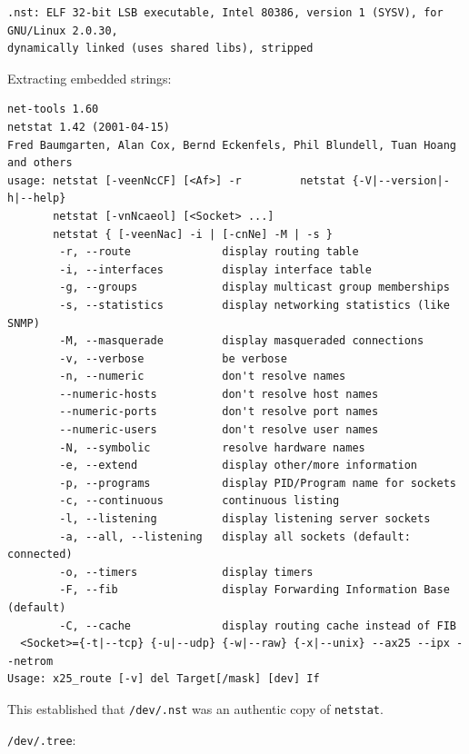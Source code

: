 \begin{lstlisting}[style=terminal]
.nst: ELF 32-bit LSB executable, Intel 80386, version 1 (SYSV), for GNU/Linux 2.0.30, 
dynamically linked (uses shared libs), stripped
\end{lstlisting}

\vspace{1em}

Extracting embedded strings:

\vspace{1em}

\begin{lstlisting}[style=terminal]
net-tools 1.60
netstat 1.42 (2001-04-15)
Fred Baumgarten, Alan Cox, Bernd Eckenfels, Phil Blundell, Tuan Hoang and others
usage: netstat [-veenNcCF] [<Af>] -r         netstat {-V|--version|-h|--help}
       netstat [-vnNcaeol] [<Socket> ...]
       netstat { [-veenNac] -i | [-cnNe] -M | -s }
        -r, --route              display routing table
        -i, --interfaces         display interface table
        -g, --groups             display multicast group memberships
        -s, --statistics         display networking statistics (like SNMP)
        -M, --masquerade         display masqueraded connections
        -v, --verbose            be verbose
        -n, --numeric            don't resolve names
        --numeric-hosts          don't resolve host names
        --numeric-ports          don't resolve port names
        --numeric-users          don't resolve user names
        -N, --symbolic           resolve hardware names
        -e, --extend             display other/more information
        -p, --programs           display PID/Program name for sockets
        -c, --continuous         continuous listing
        -l, --listening          display listening server sockets
        -a, --all, --listening   display all sockets (default: connected)
        -o, --timers             display timers
        -F, --fib                display Forwarding Information Base (default)
        -C, --cache              display routing cache instead of FIB
  <Socket>={-t|--tcp} {-u|--udp} {-w|--raw} {-x|--unix} --ax25 --ipx --netrom
Usage: x25_route [-v] del Target[/mask] [dev] If
\end{lstlisting}

\vspace{1em}

This established that \texttt{/dev/.nst} was an authentic copy of \texttt{netstat}.

\texttt{/dev/.tree}:


